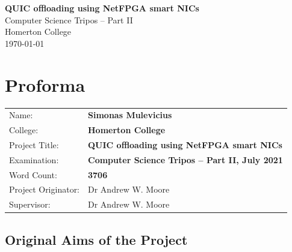 \documentclass[12pt,a4paper,twoside,openright]{report}
\begin{document}





\pagestyle{empty}


\vspace*{60mm}
\begin{center}
\Huge
\textbf{QUIC offloading using NetFPGA smart NICs} \\[5mm]
Computer Science Tripos -- Part II \\[5mm]
Homerton College \\[5mm]
\today  %
\end{center}


\pagestyle{plain}

\chapter*{Proforma}

{\large
\begin{tabular}{ll}
Name:               & \bf Simonas Mulevicius                       \\
College:            & \bf Homerton College                     \\
Project Title:      & \bf QUIC offloading using NetFPGA smart NICs \\
Examination:        & \bf Computer Science Tripos -- Part II, July 2021  \\
Word Count:         & \bf 3706\footnotemark[1] \\
Project Originator: & Dr Andrew W. Moore                \\
Supervisor:         & Dr Andrew W. Moore                \\ 
\end{tabular}
}



\section*{Original Aims of the Project}
\end{document}
